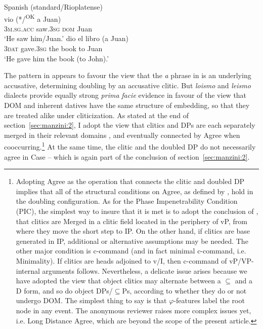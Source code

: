 \documentclass[output=paper,colorlinks,citecolor=brown]{./langscibook}
\begin{document}
\ea%
    \label{ex:manzini:24}
    Spanish (standard/Rioplatense)\\
    \ea\label{ex:manzini:24a} 
         {vio}    (*/\textsuperscript{OK} {a} Juan)\\
        \textsc{3m.sg.acc}  saw.\textsc{3sg}  \textsc{dom} Juan\\
    \glt ‘He saw him/Juan.’
    \ex\label{ex:manzini:24b} 
       {dio}     {el} {libro}   (a Juan)\\
        \textsc{3dat}   gave.\textsc{3sg}  the book   to Juan\\
    \glt ‘He gave him the book (to John).’
    \z
\z


The pattern in  appears to favour the view that the \textit{a} phrase in  is an underlying accusative, determining doubling by an accusative clitic. But \textit{loismo} and \textit{leismo} dialects provide equally strong \textit{prima} \textit{facie} evidence in favour of the view that DOM and inherent datives have the same structure of embedding, so that they are treated alike under cliticization. As stated at the end of section~\ref{sec:manzini:2}, I adopt the view that clitics and DPs are each separately merged in their relevant domains \citep{Sportiche1996}, and eventually connected by  Agree when cooccurring.\footnote{Adopting Agree as the operation that connects the clitic and doubled DP implies that all of the structural conditions on Agree, as defined by \citet{Chomsky2000}, hold in the doubling configuration. As for the Phase Impenetrability Condition (PIC), the simplest way to insure that it is met is to adopt the conclusion of \citet{Sportiche1996}, that clitics are Merged in a clitic field located in the periphery of vP, from where they move the short step to IP. On the other hand, if clitics are base generated in IP, additional or alternative assumptions may be needed. The other major condition is c-command (and in fact minimal c-command, i.e. Minimality). If clitics are heads adjoined to v/I, then c-command of vP/VP-internal arguments follows. Nevertheless, a delicate issue arises because we have adopted the view that object clitics may alternate between a \textrm{${\subseteq}$} and a D form, and so do object DPs/\textrm{${\subseteq}$}Ps, according to whether they do or not undergo DOM.  The simplest thing to say is that $\varphi $-features label the root node in any event. The anonymous reviewer raises more complex issues yet, i.e. Long Distance Agree, which are beyond the scope of the present article.}{} At the same time, the clitic and the doubled DP do not necessarily agree in Case – which is again part of the conclusion of section~\ref{sec:manzini:2}. 
\end{document}
